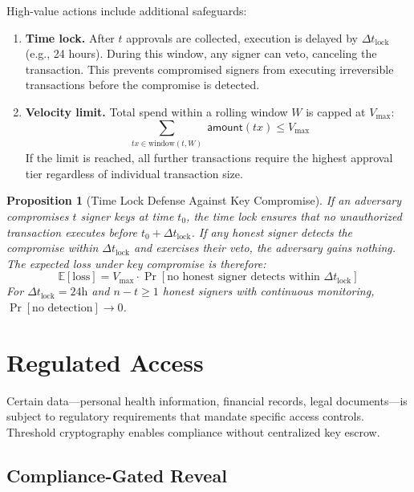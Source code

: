 \documentclass[11pt,a4paper]{article}
\newtheorem{proposition}[theorem]{Proposition}
\begin{document}
High-value actions include additional safeguards:

\begin{enumerate}
    \item \textbf{Time lock.} After $t$ approvals are collected, execution
    is delayed by $\Delta t_{\text{lock}}$ (e.g., 24 hours). During this
    window, any signer can veto, canceling the transaction. This prevents
    compromised signers from executing irreversible transactions before
    the compromise is detected.

    \item \textbf{Velocity limit.} Total spend within a rolling window $W$
    is capped at $V_{\max}$:
    \begin{equation}
        \sum_{\substack{tx \in \text{window}(t, W)}} \mathsf{amount}(tx) \leq V_{\max}
    \end{equation}
    If the limit is reached, all further transactions require the highest
    approval tier regardless of individual transaction size.
\end{enumerate}

\begin{proposition}[Time Lock Defense Against Key Compromise]
If an adversary compromises $t$ signer keys at time $t_0$, the time lock
ensures that no unauthorized transaction executes before $t_0 + \Delta t_{\text{lock}}$.
If any honest signer detects the compromise within $\Delta t_{\text{lock}}$
and exercises their veto, the adversary gains nothing. The expected loss
under key compromise is therefore:
\begin{equation}
    \mathbb{E}[\text{loss}] = V_{\max} \cdot \Pr[\text{no honest signer detects within } \Delta t_{\text{lock}}]
\end{equation}
For $\Delta t_{\text{lock}} = 24\text{h}$ and $n - t \geq 1$ honest signers
with continuous monitoring, $\Pr[\text{no detection}] \to 0$.
\end{proposition}

\section{Regulated Access}\label{sec:regulated}

Certain data---personal health information, financial records, legal
documents---is subject to regulatory requirements that mandate specific
access controls. Threshold cryptography enables compliance without
centralized key escrow.

\subsection{Compliance-Gated Reveal}
\end{document}
